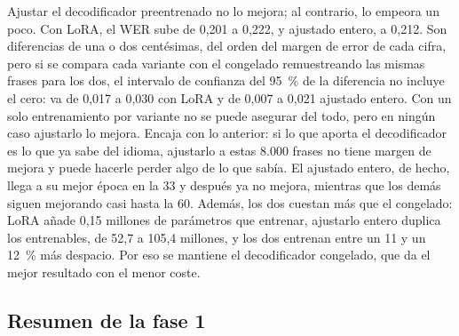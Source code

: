 Ajustar el decodificador preentrenado no lo mejora; al contrario, lo empeora un poco. Con LoRA, el WER sube de 0,201 a 0,222, y ajustado entero, a 0,212. Son diferencias de una o dos centésimas, del orden del margen de error de cada cifra, pero si se compara cada variante con el congelado remuestreando las mismas frases para los dos, el intervalo de confianza del 95~\% de la diferencia no incluye el cero: va de 0,017 a 0,030 con LoRA y de 0,007 a 0,021 ajustado entero. Con un solo entrenamiento por variante no se puede asegurar del todo, pero en ningún caso ajustarlo lo mejora. Encaja con lo anterior: si lo que aporta el decodificador es lo que ya sabe del idioma, ajustarlo a estas 8.000 frases no tiene margen de mejora y puede hacerle perder algo de lo que sabía. El ajustado entero, de hecho, llega a su mejor época en la 33 y después ya no mejora, mientras que los demás siguen mejorando casi hasta la 60. Además, los dos cuestan más que el congelado: LoRA añade 0,15 millones de parámetros que entrenar, ajustarlo entero duplica los entrenables, de 52,7 a 105,4 millones, y los dos entrenan entre un 11 y un 12~\% más despacio. Por eso se mantiene el decodificador congelado, que da el mejor resultado con el menor coste.


\subsection{Resumen de la fase 1}
\label{sec:res-resumen-fase1}

